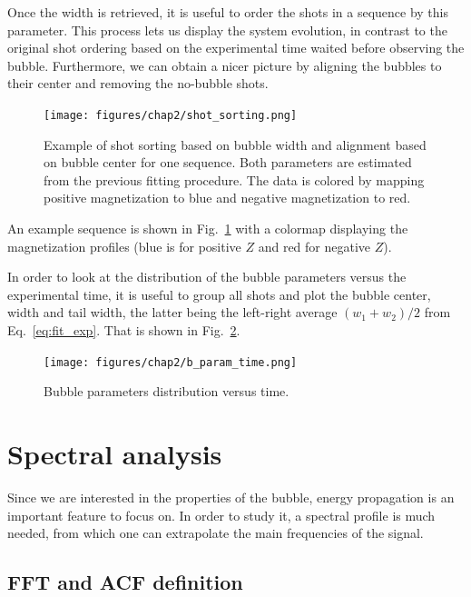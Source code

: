 Once the width is retrieved, it is useful to order the shots in a sequence by this parameter. This process lets us display the system evolution, in contrast to the original shot ordering based on the experimental time waited before observing the bubble. Furthermore, we can obtain a nicer picture by aligning the bubbles to their center and removing the no-bubble shots.
\begin{figure}[h!]
    \centering
    \texttt{[image: figures/chap2/shot\_sorting.png]}
    \caption{Example of shot sorting based on bubble width and alignment based on bubble center for one sequence. Both parameters are estimated from the previous fitting procedure. The data is colored by mapping positive magnetization to blue and negative magnetization to red.}
    \label{fig:sorting}
\end{figure}
An example sequence is shown in Fig.\ \ref{fig:sorting} with a colormap displaying the magnetization profiles (blue is for positive $Z$ and red for negative $Z$).

In order to look at the distribution of the bubble parameters versus the experimental time, it is useful to group all shots and plot the bubble center, width and tail width, the latter being the left-right average $(w_1+w_2)/2$ from Eq.\ \eqref{eq:fit_exp}. That is shown in Fig.\ \ref{fig:b_param}.
\begin{figure}[h!]
    \centering
    \texttt{[image: figures/chap2/b\_param\_time.png]}
    \caption{Bubble parameters distribution versus time.}
    \label{fig:b_param}
\end{figure}

\section{Spectral analysis}
Since we are interested in the properties of the bubble, energy propagation is an important feature to focus on. In order to study it, a spectral profile is much needed, from which one can extrapolate the main frequencies of the signal. 

\subsection{FFT and ACF definition}

